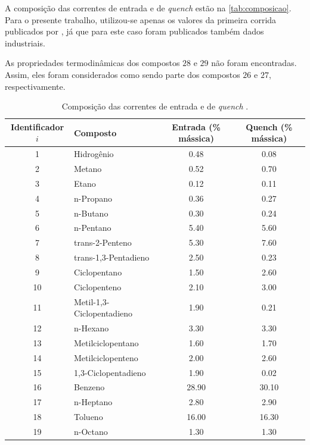 A composição das correntes de entrada e de \emph{quench} estão na
\autoref{tab:composicao}. Para o presente trabalho, utilizou-se
apenas os valores da primeira corrida publicados por , já
que para este caso foram publicados também dados industriais.

As propriedades termodinâmicas dos compostos $28$ e $29$ não foram
encontradas. Assim, eles foram considerados como sendo parte dos compostos
$26$ e $27$, respectivamente.

\begin{table}[!htb]
\begin{center}
\caption{Composição das correntes de entrada e de \emph{quench}
\cite{Rojas2014a}.}
\label{tab:composicao}
\small
\begin{tabular}{clcc}
{Identificador $i$} & {Composto} & Entrada (\% mássica) & Quench (\% mássica)
\\
\hline
1 & Hidrogênio				& \num{0,48} & \num{0,08} \\
2 & Metano					& \num{0,52} & \num{0,70} \\
3 & Etano					& \num{0,12} & \num{0,11} \\
4 & n-Propano				& \num{0,36} & \num{0,27} \\
5 & n-Butano				& \num{0,30} & \num{0,24} \\
6 & n-Pentano				& \num{5,40} & \num{5,60} \\
7 & trans-2-Penteno			& \num{5,30} & \num{7,60} \\
8 & trans-1,3-Pentadieno	& \num{2,50} & \num{0,23} \\
9 & Ciclopentano			& \num{1,50} & \num{2,60} \\
10& Ciclopenteno			& \num{2,10} & \num{3,00} \\
11& Metil-1,3-Ciclopentadieno	& \num{1,90} & \num{0,21} \\
12& n-Hexano				& \num{3,30} & \num{3,30} \\
13& Metilciclopentano		& \num{1,60} & \num{1,70} \\
14& Metilciclopenteno		& \num{2,00} & \num{2,60} \\
15& 1,3-Ciclopentadieno		& \num{1,90} & \num{0,02} \\
16& Benzeno					& \num{28,90} & \num{30,10} \\
17& n-Heptano				& \num{2,80} & \num{2,90} \\
18& Tolueno					& \num{16,00} & \num{16,30} \\
19& n-Octano				& \num{1,30} & \num{1,30} \\

\end{tabular}
\end{center}
\end{table}
